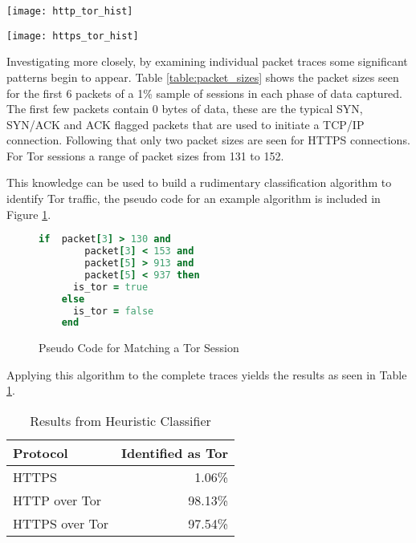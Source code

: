 \documentclass[conference]{IEEEtran}
\begin{document}
\begin{figure*}
  \centering\texttt{[image: http\_tor\_hist]}
  \caption{Histogram of packet size for HTTP traffic over Tor}
  \label{http_tor_hist}
\end{figure*}

\begin{figure*}
  \centering\texttt{[image: https\_tor\_hist]}
  \caption{Histogram of packet size for HTTPS traffic over Tor}
  \label{https_tor_hist}
\end{figure*}

Investigating more closely, by examining individual packet traces some
significant patterns begin to appear. Table \ref{table:packet_sizes} shows the
packet sizes seen for the first 6 packets of a 1\% sample of sessions in each
phase of data captured. The first few packets contain 0 bytes of data, these
are the typical SYN, SYN/ACK and ACK flagged packets that are used to initiate
a TCP/IP connection. Following that only two packet sizes are seen for HTTPS
connections. For Tor sessions a range of packet sizes from 131 to 152.



This knowledge can be used to build a rudimentary classification algorithm to
identify Tor traffic, the pseudo code for an example algorithm is included in
Figure \ref{psuedo_matcher}.

\begin{figure}[H]
  \begin{lstlisting}[language=ruby]
    if  packet[3] > 130 and
        packet[3] < 153 and
        packet[5] > 913 and
        packet[5] < 937 then
      is_tor = true
    else
      is_tor = false
    end
  \end{lstlisting}
  \caption{Pseudo Code for Matching a Tor Session}
  \label{psuedo_matcher}
\end{figure}

Applying this algorithm to the complete traces
yields the results as seen in Table \ref{table:heuristic-results}.

\begin{table}[H]
  \begin{tabular*}{\linewidth}{lr}
    \toprule
    Protocol & Identified as Tor\\
    \midrule
    HTTPS & 1.06\%\\
    HTTP over Tor & 98.13\%\\
    HTTPS over Tor & 97.54\%\\
    \bottomrule
  \end{tabular*}
  \caption{Results from Heuristic Classifier}
  \label{table:heuristic-results}
\end{table}
\end{document}
